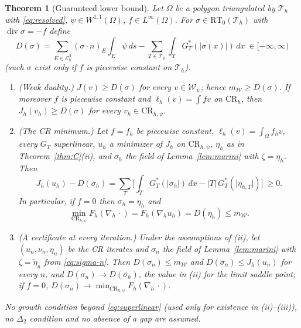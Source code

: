 \documentclass[11pt]{amsart}
\newtheorem{maintheorem}{Theorem}
\theoremstyle{definition}
\theoremstyle{remark}
\numberwithin{equation}{section}
\newcommand{\dx}{\,dx}
\newcommand{\abs}[1]{\lvert #1\rvert}
\newcommand{\CR}{\mathrm{CR}}
\newcommand{\RT}{\mathrm{RT}_0}
\newcommand{\Th}{\mathcal T_h}
\newcommand{\Eb}{\mathcal E_h^{\partial}}
\newcommand{\Wc}{\mathcal W}
\newcommand{\mW}{m_{\mathcal W}}
\DeclareMathOperator{\divg}{div}
\begin{document}
\begin{maintheorem}[Guaranteed lower bound]\label{thm:D}
Let $\Omega$ be a polygon triangulated by $\Th$ with \eqref{eq:resolved}, $\psi\in W^{1,1}(\Omega)$, $f\in L^\infty(\Omega)$. For $\sigma\in\RT(\Th)$ with $\divg\sigma=-f$ define
\begin{equation}\label{eq:D}
D(\sigma)=\sum_{E\in\Eb}(\sigma\cdot n)_E\int_E\psi\,ds-\sum_{T\in\Th}\int_TG_T^*(\abs{\sigma(x)})\dx\ \in[-\infty,\infty)
\end{equation}
\textup(such $\sigma$ exist only if $f$ is piecewise constant on $\Th$\textup).
\begin{enumerate}[label=\textup{(\roman*)}]
\item \textup{(Weak duality.)} $J(v)\ge D(\sigma)$ for every $v\in\Wc_\psi$; hence $\mW\ge D(\sigma)$. If moreover $f$ is piecewise constant and $\ell_h(v)=\int fv$ on $\CR_h$, then $J_h(v_h)\ge D(\sigma)$ for every $v_h\in\CR_{h,\psi}$.
\item \textup{(The CR minimum.)} Let $f=f_h$ be piecewise constant, $\ell_h(v)=\int_\Omega f_hv$, every $G_T$ superlinear, $u_h$ a minimizer of $J_h$ on $\CR_{h,\psi}$, $\eta_h$ as in Theorem~\ref{thm:C}(ii), and $\sigma_h$ the field of Lemma~\ref{lem:marini} with $\zeta=\eta_h$. Then
\[
J_h(u_h)-D(\sigma_h)=\sum_T\Big[\int_TG_T^*(\abs{\sigma_h})\dx-\abs T\,G_T^*(\abs{\eta_{h,T}})\Big]\ \ge0 .
\]
In particular, if $f=0$ then $\sigma_h=\eta_h$ and
\[
\min_{\CR_{h,\psi}}F_h(\nabla_h\,\cdot)=F_h(\nabla_hu_h)=D(\eta_h)\le\mW .
\]
\item \textup{(A certificate at every iteration.)} Under the assumptions of (ii), let $(u_n,\nu_n,\eta_n)$ be the CR iterates and $\sigma_n$ the field of Lemma~\ref{lem:marini} with $\zeta=\tilde\eta_n$ from \eqref{eq:sigma-n}. Then $D(\sigma_n)\le\mW$ and $D(\sigma_n)\le J_h(u_n)$ for every $n$, and $D(\sigma_n)\to D(\bar\sigma_h)$, the value in (ii) for the limit saddle point; if $f=0$, $D(\sigma_n)\to\min_{\CR_{h,\psi}}F_h(\nabla_h\,\cdot)$.
\end{enumerate}
No growth condition beyond \eqref{eq:superlinear} \textup(used only for existence in (ii)--(iii)\textup), no $\Delta_2$ condition and no absence of a gap are assumed.
\end{maintheorem}
\end{document}
